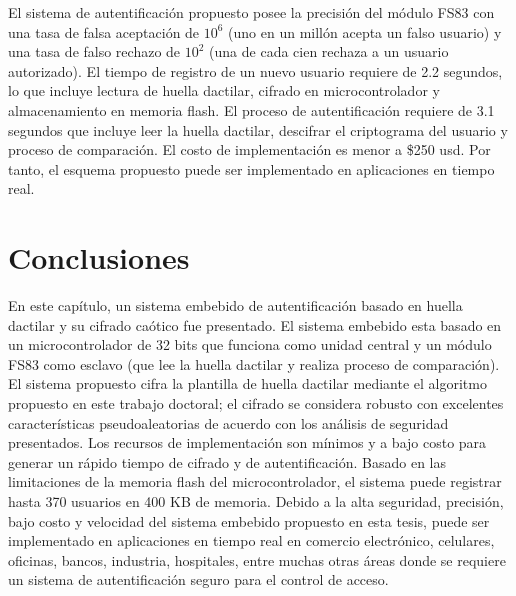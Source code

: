 El sistema de autentificación propuesto posee la precisión del módulo FS83 con una tasa de falsa aceptación de $10^{6}$ (uno en un millón acepta un falso usuario) y una tasa de falso rechazo de $10^{2}$ (una de cada cien rechaza a un usuario autorizado). El tiempo de registro de un nuevo usuario requiere de 2.2 segundos, lo que incluye lectura de huella dactilar, cifrado en microcontrolador y almacenamiento en memoria flash. El proceso de autentificación requiere de 3.1 segundos que incluye leer la huella dactilar, descifrar el criptograma del usuario y proceso de comparación. El costo de implementación es menor a \$250 usd. Por tanto, el esquema propuesto puede ser implementado en aplicaciones en tiempo real. 

\section{Conclusiones}
En este capítulo, un sistema embebido de autentificación basado en huella dactilar y su cifrado caótico fue presentado. El sistema embebido esta basado en un microcontrolador de 32 bits que funciona como unidad central y un módulo FS83 como esclavo (que lee la huella dactilar y realiza proceso de comparación). El sistema propuesto cifra la plantilla de huella dactilar mediante el algoritmo propuesto en este trabajo doctoral; el cifrado se considera robusto con excelentes características pseudoaleatorias de acuerdo con los análisis de seguridad presentados. Los recursos de implementación son mínimos y a bajo costo para generar un rápido tiempo de cifrado y de autentificación. Basado en las limitaciones de la memoria flash del microcontrolador, el sistema puede registrar hasta 370 usuarios en 400 KB de memoria. Debido a la alta seguridad, precisión, bajo costo y velocidad del sistema embebido propuesto en esta tesis, puede ser implementado en aplicaciones en tiempo real en comercio electrónico, celulares, oficinas, bancos, industria, hospitales, entre muchas otras áreas donde se requiere un sistema de autentificación seguro para el control de acceso.

